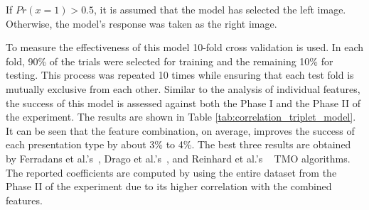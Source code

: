 If $Pr(x = 1) > 0.5$, it is assumed that the model has selected the left image. Otherwise, the model’s response was taken as the right image.

To measure the effectiveness of this model 10-fold cross validation is used. In each fold, 90\% of the trials were selected for training and the remaining 10\% for testing. This process was repeated 10 times while ensuring that each test fold is mutually exclusive from each other. Similar to the analysis of individual features, the success of this model is assessed against both the Phase I and the Phase II of the experiment. The results are shown in Table \ref{tab:correlation_triplet_model}. It can be seen that the feature combination, on average, improves the success of each presentation type by about 3\% to 4\%. The best three results are obtained by Ferradans et al.’s~\cite{ferradans2011analysis}, Drago et al.’s~\cite{drago2003adaptive}, and Reinhard et al.’s ~\cite{reinhard2002photographic} TMO algorithms. The reported coefficients are computed by using the entire dataset from the Phase II of the experiment due to its higher correlation with the combined features.

